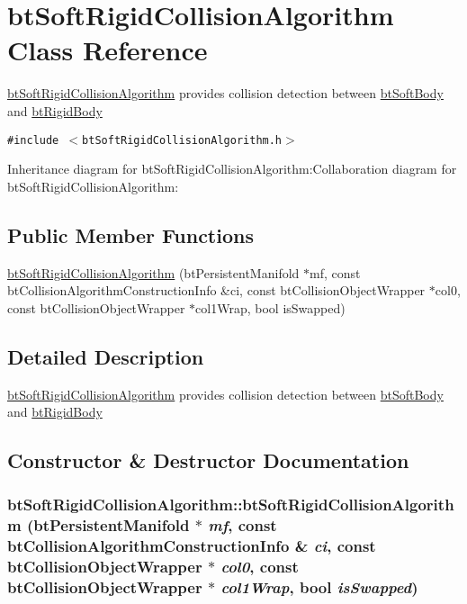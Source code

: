 \hypertarget{classbt_soft_rigid_collision_algorithm}{
\section{btSoftRigidCollisionAlgorithm Class Reference}
\label{classbt_soft_rigid_collision_algorithm}
}
\hyperlink{classbt_soft_rigid_collision_algorithm}{btSoftRigidCollisionAlgorithm} provides collision detection between \hyperlink{classbt_soft_body}{btSoftBody} and \hyperlink{classbt_rigid_body}{btRigidBody}  


{\tt \#include $<$btSoftRigidCollisionAlgorithm.h$>$}

Inheritance diagram for btSoftRigidCollisionAlgorithm:Collaboration diagram for btSoftRigidCollisionAlgorithm:\subsection*{Public Member Functions}
\begin{CompactItemize}
\item 
\hyperlink{classbt_soft_rigid_collision_algorithm_a6f289e315d626acf0a47ba093f6d4eb}{btSoftRigidCollisionAlgorithm} (btPersistentManifold $\ast$mf, const btCollisionAlgorithmConstructionInfo \&ci, const btCollisionObjectWrapper $\ast$col0, const btCollisionObjectWrapper $\ast$col1Wrap, bool isSwapped)
\end{CompactItemize}


\subsection{Detailed Description}
\hyperlink{classbt_soft_rigid_collision_algorithm}{btSoftRigidCollisionAlgorithm} provides collision detection between \hyperlink{classbt_soft_body}{btSoftBody} and \hyperlink{classbt_rigid_body}{btRigidBody} 

\subsection{Constructor \& Destructor Documentation}
\hypertarget{classbt_soft_rigid_collision_algorithm_a6f289e315d626acf0a47ba093f6d4eb}{
\subsubsection[btSoftRigidCollisionAlgorithm]{\setlength{\rightskip}{0pt plus 5cm}btSoftRigidCollisionAlgorithm::btSoftRigidCollisionAlgorithm (btPersistentManifold $\ast$ {\em mf}, \/  const btCollisionAlgorithmConstructionInfo \& {\em ci}, \/  const btCollisionObjectWrapper $\ast$ {\em col0}, \/  const btCollisionObjectWrapper $\ast$ {\em col1Wrap}, \/  bool {\em isSwapped})}}
\label{classbt_soft_rigid_collision_algorithm_a6f289e315d626acf0a47ba093f6d4eb}


